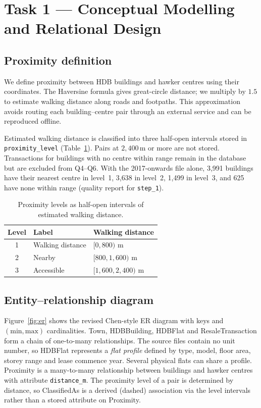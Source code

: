 \section{Task 1 --- Conceptual Modelling and Relational Design}

\subsection{Proximity definition}
We define proximity between HDB buildings and hawker centres using their coordinates.
The Haversine formula gives great-circle distance; we multiply by $1.5$ to estimate walking distance along roads and footpaths.
This approximation avoids routing each building--centre pair through an external service and can be reproduced offline.

Estimated walking distance is classified into three half-open intervals stored in \texttt{proximity\_level} (Table~\ref{tab:levels}).
Pairs at $2{,}400\,\mathrm{m}$ or more are not stored.
Transactions for buildings with no centre within range remain in the database but are excluded from Q4--Q6.
With the 2017-onwards file alone, 3{,}991 buildings have their nearest centre in level~1, 3{,}638 in level~2, 1{,}499 in level~3, and 625 have none within range (quality report for \texttt{step\_1}).

\begin{table}[H]
\centering
\caption{Proximity levels as half-open intervals of estimated walking distance.}
\label{tab:levels}
\begin{tabular}{@{}cll@{}}
\toprule
Level & Label & Walking distance \\
\midrule
1 & Walking distance & $[0, 800)$ m \\
2 & Nearby & $[800, 1{,}600)$ m \\
3 & Accessible & $[1{,}600, 2{,}400)$ m \\
\bottomrule
\end{tabular}
\end{table}

\subsection{Entity--relationship diagram}
Figure~\ref{fig:er} shows the revised Chen-style ER diagram with keys and $(\mathrm{min},\mathrm{max})$ cardinalities.
Town, HDBBuilding, HDBFlat and ResaleTransaction form a chain of one-to-many relationships.
The source files contain no unit number, so HDBFlat represents a \emph{flat profile} defined by type, model, floor area, storey range and lease commence year.
Several physical flats can share a profile.
Proximity is a many-to-many relationship between buildings and hawker centres with attribute \texttt{distance\_m}.
The proximity level of a pair is determined by distance, so ClassifiedAs is a derived (dashed) association via the level intervals rather than a stored attribute on Proximity.

